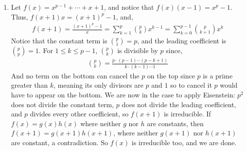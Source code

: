 \documentclass[12pt]{article}
\theoremstyle{definitionstyle}
\begin{document}
\begin{enumerate}[leftmargin=\labelsep]
		\item Let $f(x) = x^{p-1} + \cdots + x + 1$, and notice that $f(x)(x-1) = x^p - 1$. Thus, $f(x+1)x = (x+1)^p - 1$, and,
		\begin{align*}
			f(x+1) = \frac{(x+1)^p - 1}{x} = \sum_{k=1}^p {p \choose k}x^{k-1} = \sum_{k=0}^{p-1} {p \choose k+1} x^k
		\end{align*}
		Notice that the constant term is ${p \choose 1} = p$, and the leading coefficient is ${p \choose p} = 1$. For $1 \leq k \leq p-1$, ${p \choose k}$ is divisible by $p$ since,
		\begin{align*}
			{p \choose k} = \frac{p \cdot (p-1) \cdots (p-k+1)}{k \cdot (k-1) \cdots 1}
		\end{align*}
		And no term on the bottom can cancel the $p$ on the top since $p$ is a prime greater than $k$, meaning its only divisors are $p$ and $1$ so to cancel it $p$ would have to appear on the bottom. We are now in the case to apply Eisenstein: $p^2$ does not divide the constant term, $p$ does not divide the leading coefficient, and $p$ divides every other coefficient, so $f(x+1)$ is irreducible. If $f(x) = g(x)h(x)$ where neither $g$ nor $h$ are constants, then $f(x+1) = g(x+1)h(x+1)$, where neither $g(x+1)$ nor $h(x+1)$ are constant, a contradiction. So $f(x)$ is irreducible too, and we are done.
	\end{enumerate}
\end{document}

